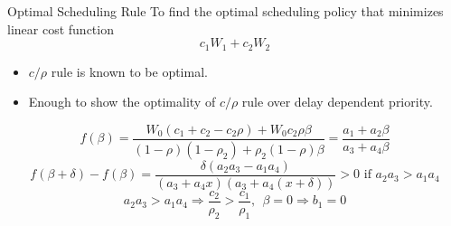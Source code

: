 \documentclass[compress, serif, onlymath, professionalfonts]{beamer}
\begin{document}
\begin{frame}{Optimal Scheduling Rule}
To find the optimal scheduling policy that minimizes linear cost function
$$c_1W_1+c_2W_2$$
\vspace{-.6cm}
\begin{itemize}
\item $c/\rho$ rule is known to be optimal.
\item Enough to show the optimality of $c/\rho$ rule over delay dependent priority.
\end{itemize}
\vspace{.3cm}
$$f(\beta) = \frac{W_0(c_1+c_2 - c_2 \rho) + W_0 c_2\rho\beta}{(1-\rho)(1-\rho_2) + \rho_2(1-\rho)\beta} = \frac{a_1 + a_2\beta}{a_3 + a_4\beta}$$
$$f(\beta +\delta) - f(\beta) = \frac{\delta(a_2a_3-a_1a_4)}{(a_3+a_4x)(a_3+a_4(x+\delta))} > 0 \text{ if } a_2a_3 > a_1a_4$$
$$a_2a_3 > a_1a_4 \Rightarrow \frac{c_2}{\rho_2} > \frac{c_1}{\rho_1}, ~~\beta = 0 \Rightarrow b_1 = 0$$ 
\end{frame}
\end{document}
